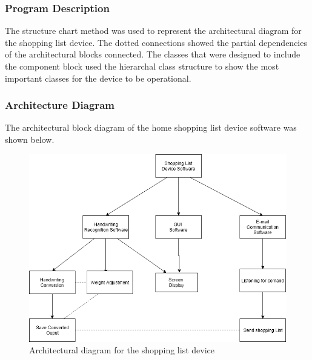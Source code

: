 \subsubsection{Program Description}
The structure chart method was used to represent the architectural diagram for the shopping list device. The dotted connections showed the partial dependencies of the architectural blocks connected. The classes that were designed to include the component block used the hierarchal class structure to show the most important classes for the device to be operational.
\subsubsection{Architecture Diagram}
The architectural block diagram of the home shopping list device software was shown below.
\begin{figure}[h]
	\centering
	\includegraphics[scale=0.6]{38}
	\caption{Architectural diagram for the shopping list device}
\end{figure}

